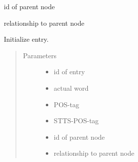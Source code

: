 \documentclass[letterpaper,10pt,english]{sphinxmanual}
\begin{document}
\begin{fulllineitems}
\begin{fulllineitems}
\end{fulllineitems}


\begin{fulllineitems}
\label{\detokenize{api:conll_parser.Entry.head}}
id of parent node

\end{fulllineitems}


\begin{fulllineitems}
\label{\detokenize{api:conll_parser.Entry.dep}}
relationship to parent node

\end{fulllineitems}


\begin{fulllineitems}
\label{\detokenize{api:conll_parser.Entry.__init__}}
Initialize entry.
\begin{quote}\begin{description}
\item[{Parameters}] \leavevmode\begin{itemize}
\item {} 
 \textendash{} id of entry

\item {} 
 \textendash{} actual word

\item {} 
 \textendash{} POS-tag

\item {} 
 \textendash{} STTS-POS-tag

\item {} 
 \textendash{} id of parent node

\item {} 
 \textendash{} relationship to parent node

\end{itemize}

\end{description}\end{quote}

\end{fulllineitems}


\end{fulllineitems}
\end{document}
